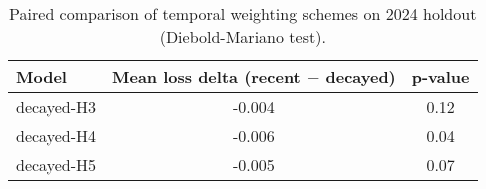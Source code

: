 \begin{table}[t]
  \centering
  \small
  \caption{Paired comparison of temporal weighting schemes on 2024 holdout (Diebold-Mariano test).}
  \label{tab:dm-test}
  \begin{tabular}{lcc}
    \toprule
    \textbf{Model}  & \textbf{Mean loss delta (recent $-$ decayed)}  & \textbf{p-value} \\
    \midrule
    decayed-H3 & -0.004 & 0.12 \\
    decayed-H4 & -0.006 & 0.04 \\
    decayed-H5 & -0.005 & 0.07 \\
    \bottomrule
  \end{tabular}
\end{table}
